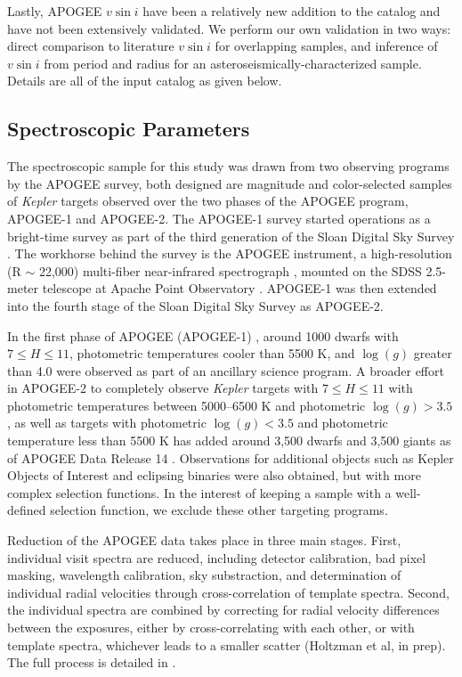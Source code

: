 \documentclass[manuscript]{aastex6}
\newcommand{\vsini}{\ensuremath{v \sin i}}
\newcommand{\Kepler}{\mbox{\textit{Kepler}}}
\newcommand{\logg}{\ensuremath{\log(g)}}
\begin{document}
Lastly, APOGEE \vsini{} have been a relatively new addition to the catalog and
have not been extensively validated. We perform our own validation in two ways:
direct comparison to literature \vsini{} for overlapping samples, and inference
of \vsini{} from period and radius for an asteroseismically-characterized 
sample. Details are all of the input catalog as given below.

\subsection{Spectroscopic Parameters}

The spectroscopic sample for this study was drawn from two observing programs by the APOGEE
survey, both designed are magnitude and color-selected samples of
\Kepler{} targets observed over the two phases of the APOGEE program, APOGEE-1
and APOGEE-2. The APOGEE-1 survey started operations as a bright-time
survey as part of the third generation of the Sloan Digital Sky Survey
\citep{Eisenstein11}. The workhorse behind the survey is the APOGEE instrument,
a high-resolution (R \(\sim\) 22,000) multi-fiber near-infrared spectrograph
\citep{Wilson10}, mounted on the SDSS 2.5-meter telescope at Apache Point
Observatory \citep{Gunn06}. APOGEE-1 was then extended into the fourth stage of
the Sloan Digital Sky Survey \citep{Blanton17} as APOGEE-2. 

In the first phase of APOGEE (APOGEE-1) \citep{Majewski17}, around 1000 dwarfs
with \(7 \le H \le 11\), photometric temperatures cooler than 5500 K, and
\logg{} greater than 4.0 \citep{Brown11,Pinsonneault12} were observed as part
of an ancillary science program. A broader effort in APOGEE-2 to completely observe
\Kepler{} targets with \(7 \le H \le 11\) with photometric temperatures between
5000--6500 K and photometric \(\logg > 3.5\), as well as targets with
photometric \(\logg < 3.5\) and photometric temperature less than 5500 K  
\citep{Pinsonneault12,Huber14} has added around 3,500 dwarfs and 3,500 giants 
as of APOGEE Data Release 14 \citep{Zasowski17}. Observations for additional 
objects such as Kepler Objects of Interest and eclipsing binaries were also 
obtained, but with more complex selection functions. In the interest of keeping
a sample with a well-defined selection function, we exclude these other
targeting programs.




Reduction of the APOGEE data takes place in three main stages. First,
individual visit spectra are reduced, including detector calibration, bad pixel
masking, wavelength calibration, sky substraction, and determination of
individual radial velocities through cross-correlation of template spectra.
Second, the individual spectra are combined by correcting for radial velocity
differences between the exposures, either by cross-correlating with each other,
or with template spectra, whichever leads to a smaller scatter (Holtzman et
al, in prep). The full process is detailed in \citet{Nidever15}.
\end{document}
